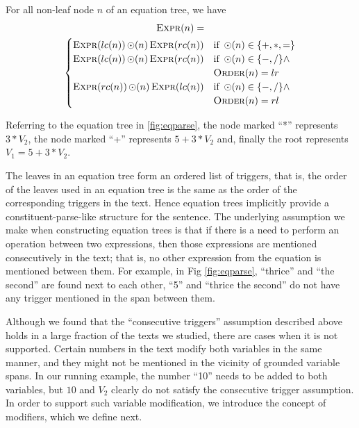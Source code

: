   For all non-leaf node $n$ of an equation tree, we have
  \begin{multline}\label{eq:parse}
    \operatorname{\textsc{Expr}}(n) = \\
    \begin{cases}
    \operatorname{\textsc{Expr}}(lc(n)) \operatorname{\odot}(n) \operatorname{\textsc{Expr}}(rc(n)) & \mbox{if } \operatorname{\odot}(n) \in \{+,*, =\} \\
    \operatorname{\textsc{Expr}}(lc(n)) \operatorname{\odot}(n) \operatorname{\textsc{Expr}}(rc(n)) &  \mbox{if } \operatorname{\odot}(n) \in \{-,/\} \wedge\\
    & \operatorname{\textsc{Order}}(n)=lr \\
    \operatorname{\textsc{Expr}}(rc(n)) \operatorname{\odot}(n) \operatorname{\textsc{Expr}}(lc(n)) &  \mbox{if } \operatorname{\odot}(n) \in \{-,/\} \wedge\\
    & \operatorname{\textsc{Order}}(n)=rl \\
    \end{cases}
  \end{multline}

  Referring to the equation tree in \ref{fig:eqparse}, the node marked
  ``*'' represents $3*V_2$, the node marked ``+'' represents
  $5+3*V_2$ and, finally the root represents $V_1=5+3*V_2$.
  
  The leaves in an equation tree form an ordered list of triggers,
  that is, the order of the leaves used in an equation tree is the
  same as the order of the corresponding triggers in the text. Hence
  equation trees implicitly provide a constituent-parse-like structure
  for the sentence. The underlying assumption we make when
  constructing equation trees is that if there is a need to perform an
  operation between two expressions, then those expressions are
  mentioned consecutively in the text; that is, no other expression
  from the equation is mentioned between them. For example, in Fig
  \ref{fig:eqparse}, ``thrice'' and ``the second'' are found next to
  each other, ``5'' and ``thrice the second'' do not have any
  trigger mentioned in the span between them.

  Although we found that the ``consecutive triggers'' assumption
  described above holds in a large fraction of the texts we studied,
  there are cases when it is not supported. Certain numbers in the
  text modify both variables in the same manner, and they might not be
  mentioned in the vicinity of grounded variable spans. In our running
  example, the number ``10'' needs to be added to both variables, but
  $10$ and $V_2$ clearly do not satisfy the consecutive trigger
  assumption. In order to support such variable modification, we
  introduce the concept of modifiers, which we define next.

